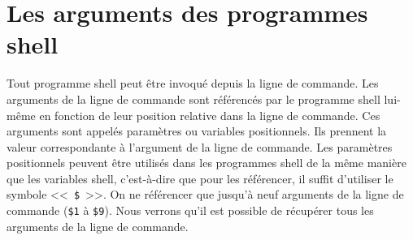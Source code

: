 %
%


\setcounter{remarque-cnt}{1}
\setcounter{example-cnt}{1}
\chapter{Les arguments des programmes shell}
\thispagestyle{fancy}

Tout programme shell peut {\^e}tre invoqu{\'e} depuis la ligne de
commande. Les arguments de la ligne de commande
sont r{\'e}f{\'e}renc{\'e}s par le programme shell lui-m{\^e}me en
fonction de leur position relative dans la ligne de commande. Ces
arguments sont appel{\'e}s param{\`e}tres ou
variables positionnels. Ils prennent la
valeur correspondante {\`a} l'argument de la ligne de commande. Les
param{\`e}tres positionnels peuvent {\^e}tre utilis{\'e}s dans les
programmes shell de la m{\^e}me mani{\`e}re que les variables shell,
c'est-{\`a}-dire que pour les r{\'e}f{\'e}rencer, il suffit d'utiliser
le symbole <<~\verb=$=~>>. On ne r{\'e}f{\'e}rencer que jusqu'{\`a} neuf
arguments de la ligne de commande (\verb=$1= {\`a} \verb=$9=). Nous
verrons qu'il est possible de r{\'e}cup{\'e}rer tous les arguments de la
ligne de commande.


